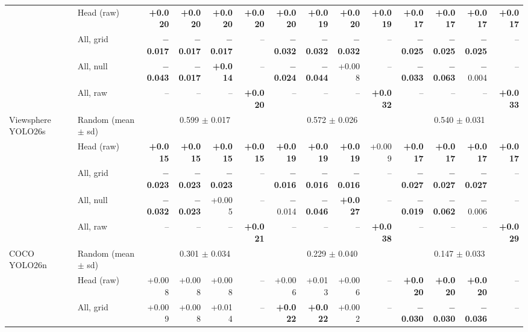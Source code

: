 \begin{tabular}{llrrrrrrrrrrrr}
 & Head (raw) & \textbf{+0.020} & \textbf{+0.020} & \textbf{+0.020} & \textbf{+0.020} & \textbf{+0.020} & \textbf{+0.019} & \textbf{+0.020} & \textbf{+0.019} & \textbf{+0.017} & \textbf{+0.017} & \textbf{+0.017} & \textbf{+0.017} \\
 & All, grid & \textbf{$-$0.017} & \textbf{$-$0.017} & \textbf{$-$0.017} & -- & \textbf{$-$0.032} & \textbf{$-$0.032} & \textbf{$-$0.032} & -- & \textbf{$-$0.025} & \textbf{$-$0.025} & \textbf{$-$0.025} & -- \\
 & All, null & \textbf{$-$0.043} & \textbf{$-$0.017} & \textbf{+0.014} & -- & \textbf{$-$0.024} & \textbf{$-$0.044} & +0.008 & -- & \textbf{$-$0.033} & \textbf{$-$0.063} & $-$0.004 & -- \\
 & All, raw & -- & -- & -- & \textbf{+0.020} & -- & -- & -- & \textbf{+0.032} & -- & -- & -- & \textbf{+0.033} \\
\midrule
Viewsphere YOLO26s & Random (mean $\pm$ sd) & \multicolumn{4}{c}{0.599 $\pm$ 0.017} & \multicolumn{4}{c}{0.572 $\pm$ 0.026} & \multicolumn{4}{c}{0.540 $\pm$ 0.031} \\
 & Head (raw) & \textbf{+0.015} & \textbf{+0.015} & \textbf{+0.015} & \textbf{+0.015} & \textbf{+0.019} & \textbf{+0.019} & \textbf{+0.019} & +0.009 & \textbf{+0.017} & \textbf{+0.017} & \textbf{+0.017} & \textbf{+0.017} \\
 & All, grid & \textbf{$-$0.023} & \textbf{$-$0.023} & \textbf{$-$0.023} & -- & \textbf{$-$0.016} & \textbf{$-$0.016} & \textbf{$-$0.016} & -- & \textbf{$-$0.027} & \textbf{$-$0.027} & \textbf{$-$0.027} & -- \\
 & All, null & \textbf{$-$0.032} & \textbf{$-$0.023} & +0.005 & -- & $-$0.014 & \textbf{$-$0.046} & \textbf{+0.027} & -- & \textbf{$-$0.019} & \textbf{$-$0.062} & $-$0.006 & -- \\
 & All, raw & -- & -- & -- & \textbf{+0.021} & -- & -- & -- & \textbf{+0.038} & -- & -- & -- & \textbf{+0.029} \\
\midrule
COCO YOLO26n & Random (mean $\pm$ sd) & \multicolumn{4}{c}{0.301 $\pm$ 0.034} & \multicolumn{4}{c}{0.229 $\pm$ 0.040} & \multicolumn{4}{c}{0.147 $\pm$ 0.033} \\
 & Head (raw) & +0.008 & +0.008 & +0.008 & -- & +0.006 & +0.013 & +0.006 & -- & \textbf{+0.020} & \textbf{+0.020} & \textbf{+0.020} & -- \\
 & All, grid & +0.009 & +0.008 & +0.014 & -- & \textbf{+0.022} & \textbf{+0.022} & +0.002 & -- & \textbf{$-$0.030} & \textbf{$-$0.030} & \textbf{$-$0.036} & -- \\

\end{tabular}
